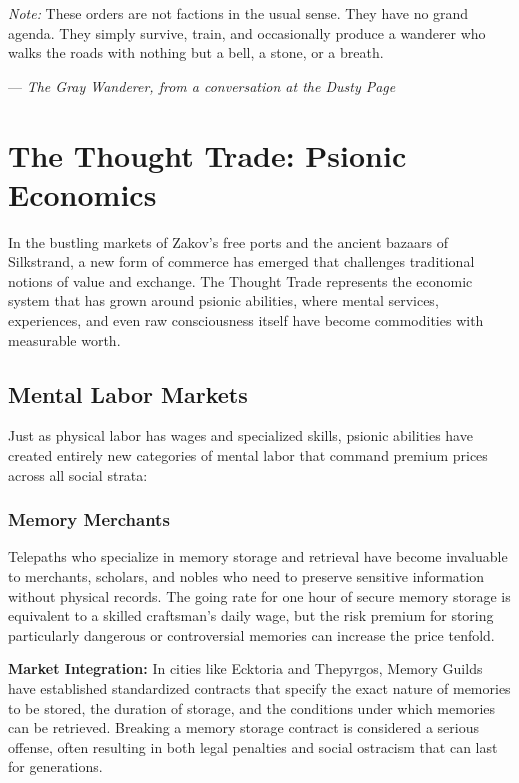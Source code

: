 \documentclass[11pt,twoside]{article}
\begin{document}
\noindent \textit{Note:} These orders are not factions in the usual sense. They have no grand agenda. They simply survive, train, and occasionally produce a wanderer who walks the roads with nothing but a bell, a stone, or a breath.

\vspace{0.5cm}
\hfill --- \textit{The Gray Wanderer, from a conversation at the Dusty Page}


\section{The Thought Trade: Psionic Economics}

In the bustling markets of Zakov's free ports and the ancient bazaars of Silkstrand, a new form of commerce has emerged that challenges traditional notions of value and exchange. The Thought Trade represents the economic system that has grown around psionic abilities, where mental services, experiences, and even raw consciousness itself have become commodities with measurable worth.

\subsection{Mental Labor Markets}

Just as physical labor has wages and specialized skills, psionic abilities have created entirely new categories of mental labor that command premium prices across all social strata:

\subsubsection{Memory Merchants}
Telepaths who specialize in memory storage and retrieval have become invaluable to merchants, scholars, and nobles who need to preserve sensitive information without physical records. The going rate for one hour of secure memory storage is equivalent to a skilled craftsman's daily wage, but the risk premium for storing particularly dangerous or controversial memories can increase the price tenfold.

\textbf{Market Integration:} In cities like Ecktoria and Thepyrgos, Memory Guilds have established standardized contracts that specify the exact nature of memories to be stored, the duration of storage, and the conditions under which memories can be retrieved. Breaking a memory storage contract is considered a serious offense, often resulting in both legal penalties and social ostracism that can last for generations.
\end{document}

